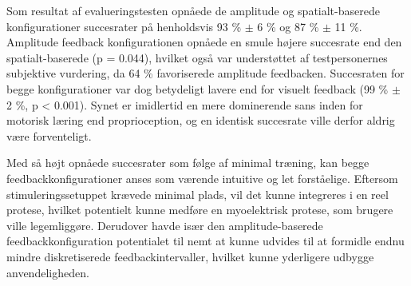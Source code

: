 Som resultat af evalueringstesten opnåede de amplitude og spatialt-baserede konfigurationer succesrater på henholdsvis 93 \% $\pm$ 6 \% og 87 \% $\pm$ 11 \%. Amplitude feedback konfigurationen opnåede en smule højere succesrate end den spatialt-baserede (p = 0.044), hvilket også var understøttet af testpersonernes subjektive vurdering, da 64 \% favoriserede amplitude feedbacken. Succesraten for begge konfigurationer var dog betydeligt lavere end for visuelt feedback (99 \% $\pm$ 2 \%, p < 0.001). Synet er imidlertid en mere dominerende sans inden for motorisk læring end proprioception, og en identisk succesrate ville derfor aldrig være forventeligt. 

Med så højt opnåede succesrater som følge af minimal træning, kan begge feedbackkonfigurationer anses som værende intuitive og let forståelige. Eftersom stimuleringssetuppet krævede minimal plads, vil det kunne integreres i en reel protese, hvilket potentielt kunne medføre en myoelektrisk protese, som brugere ville legemliggøre. Derudover havde især den amplitude-baserede feedbackkonfiguration potentialet til nemt at kunne udvides til at formidle endnu mindre diskretiserede feedbackintervaller, hvilket kunne yderligere udbygge anvendeligheden.
